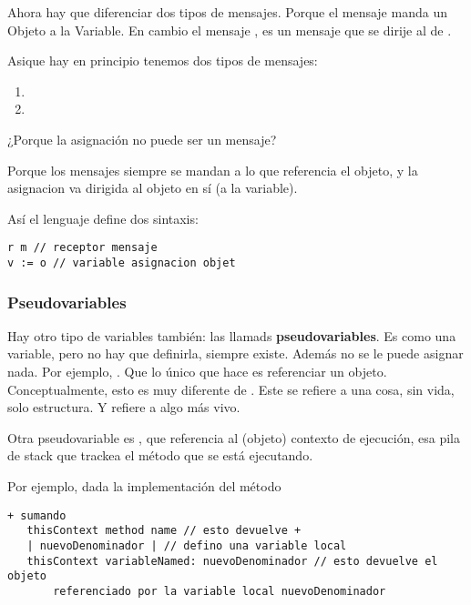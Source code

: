 Ahora hay que diferenciar dos tipos de mensajes. Porque el mensaje \code{:=} manda un Objeto a la Variable. En cambio el mensaje , es un mensaje que se dirije al  de . 

Asique hay en principio tenemos dos tipos de mensajes: 
\begin{enumerate}
 \item {}
 \item {}
\end{enumerate}

¿Porque la asignación no puede ser un mensaje? 

Porque los mensajes siempre se mandan a lo que referencia el objeto, y la asignacion va dirigida al objeto en sí (a la variable). 

Así el lenguaje define dos sintaxis: 

\begin{verbatim}
r m // receptor mensaje
v := o // variable asignacion objet
\end{verbatim}

\subsubsection{Pseudovariables}

Hay otro tipo de variables también: las llamads \textbf{pseudovariables}. Es como una variable, pero no hay que definirla, siempre existe. Además no se le puede asignar nada. Por ejemplo, . Que lo único que hace es referenciar un objeto. 
Conceptualmente, esto es muy diferente de . Este se refiere a una cosa, sin vida, solo estructura. Y  refiere a algo más vivo. 

Otra pseudovariable es , que referencia al (objeto) contexto de ejecución, esa pila de stack que trackea el método que se está ejecutando.  

Por ejemplo, dada la implementación del método
\begin{verbatim}
+ sumando
   thisContext method name // esto devuelve +
   | nuevoDenominador | // defino una variable local
   thisContext variableNamed: nuevoDenominador // esto devuelve el objeto 
       referenciado por la variable local nuevoDenominador
\end{verbatim}



